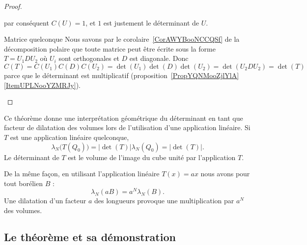 \begin{proof}
\begin{subproof}
\begin{equation}
		\end{equation}
		par conséquent \( C(U)=1\), et \( 1\) est justement le déterminant de \( U\).
		\item[Matrice quelconque]
		Nous savons par le corolaire~\ref{CorAWYBooNCCQSf} de la décomposition polaire que toute matrice peut être écrite sous la forme \( T=U_1DU_2\) où \( U_i\) sont orthogonales et \( D\) est diagonale. Donc \( C(T)=C(U_1)C(D)C(U_2)=\det(U_1)\det(D)\det(U_2)=\det(U_2DU_2)=\det(T)\) parce que le déterminant est multiplicatif (proposition~\ref{PropYQNMooZjlYlA}\ref{ItemUPLNooYZMRJy}).
	\end{subproof}
\end{proof}

Ce théorème donne une interprétation géométrique du déterminant en tant que facteur de dilatation des volumes lors de l'utilisation d'une application linéaire. Si \( T\) est une application linéaire quelconque,
\begin{equation}
	\lambda_N\big( T(Q_0) \big)=| \det(T) |\lambda_N(Q_0)=| \det(T) |.
\end{equation}
Le déterminant de \( T\) est le volume de l'image du cube unité par l'application \( T\).

De la même façon, en utilisant l'application linéaire \( T(x)=ax\) nous avons pour tout borélien \( B\) :
\begin{equation}
	\lambda_N(aB)=a^N\lambda_N(B).
\end{equation}
Une dilatation d'un facteur \( a\) des longueurs provoque une multiplication par \( a^N\) des volumes.

\subsection{Le théorème et sa démonstration}

